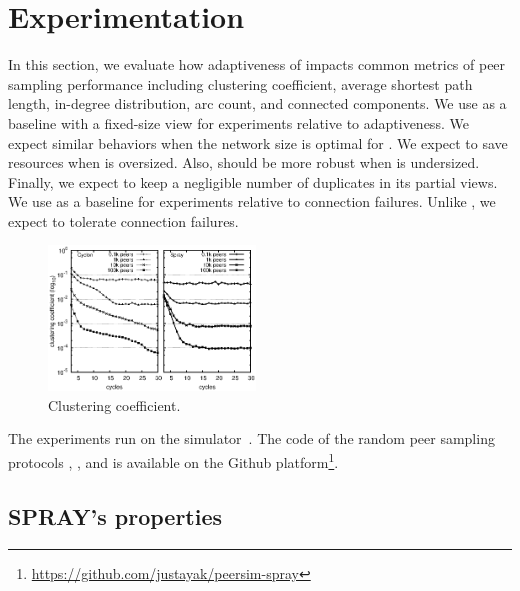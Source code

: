 \section{Experimentation}
\label{sec:experiments}

In this section, we evaluate how adaptiveness of \SPRAY impacts common
metrics of peer sampling performance including clustering coefficient,
average shortest path length, in-degree distribution, arc count, and
connected components. We use \CYCLON as a baseline with a fixed-size
view for experiments relative to adaptiveness. We expect similar
behaviors when the network size is optimal for \CYCLON. We expect
\SPRAY to save resources when \CYCLON is oversized. Also, \SPRAY
should be more robust when \CYCLON is undersized. Finally, we expect
\SPRAY to keep a negligible number of duplicates in its partial
views. We use \SCAMP as a baseline for experiments relative to
connection failures. Unlike \SCAMP, we expect \SPRAY to
tolerate connection failures.

\begin{figure}
  \centering
  \includegraphics[width=0.49\textwidth]{img/simple.eps}
  \caption{\label{fig:avgpath}Clustering coefficient.}
\end{figure}

The experiments run on the \PEERSIM
simulator~\cite{montresor2009peersim}. The code of the random peer sampling
protocols \CYCLON, \SCAMP, and \SPRAY is available on the Github
platform\footnote{\url{https://github.com/justayak/peersim-spray}}.

\subsection{SPRAY's properties}

